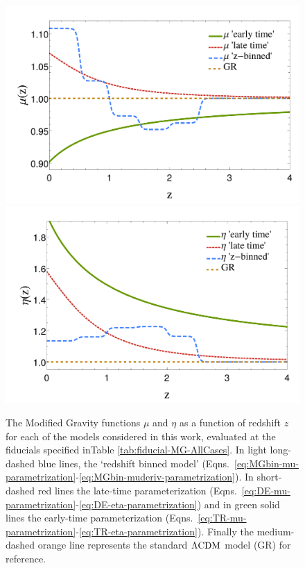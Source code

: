 \begin{figure}[htbp]
	\centering{}\begin{center}
		\includegraphics[width=0.45\linewidth]{Chapters/linear-nonlinear-MG-forecasts/figures/fiducials/muFiducialsPlot}
		\includegraphics[width=0.45\linewidth]{Chapters/linear-nonlinear-MG-forecasts/figures/fiducials/etaFiducialsPlot}
	\end{center}
	\caption[Modified Gravity functions $\eta$ and $\mu$.]{\label{fig:fidplot}
The Modified Gravity functions $\mu$ and $\eta$ as a function of redshift $z$ for each of the models considered in this work, evaluated at the fiducials specified inTable \ref{tab:fiducial-MG-AllCases}. 
In light long-dashed blue lines, the `redshift binned model' (Eqns.\ \ref{eq:MGbin-mu-parametrization}-\ref{eq:MGbin-muderiv-parametrization}). In short-dashed red lines the late-time parameterization (Eqns.\ \ref{eq:DE-mu-parametrization}-\ref{eq:DE-eta-parametrization}) and in green solid lines the early-time parameterization (Eqns.\ \ref{eq:TR-mu-parametrization}-\ref{eq:TR-eta-parametrization}). Finally the medium-dashed orange line represents the standard $\Lambda\mathrm{CDM}$ model (GR) for reference.
		}
\end{figure}


